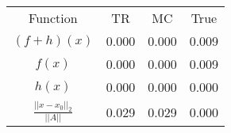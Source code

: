 \begin{tabular}{| c |c |c |c |}
    \hline
    \rowcolor[gray]{0.9}
\multicolumn{4}{|c|}{Minima} \\ \hline Function & TR & MC & True \\
    \hline
  \rowcolor[gray]{0.7}
    $ (f + h)(x) $ & 0.000 & 0.000 & 0.009 \\
  \hline
  \rowcolor[gray]{0.8}
    $ f(x) $ & 0.000 & 0.000 & 0.009 \\
  \hline
  \rowcolor[gray]{0.7}
    $ h(x) $ & 0.000 & 0.000 & 0.000 \\
  \hline
  \rowcolor[gray]{0.8}
    $ \frac{||x - x_0||_2}{||A||} $ & 0.029 & 0.029 & 0.000 \\
  \hline
\end{tabular}
